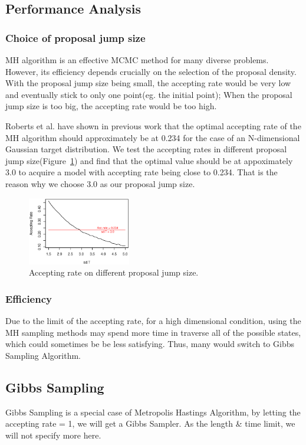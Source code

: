 \subsection{Performance Analysis}

\subsubsection{Choice of proposal jump size}
MH algorithm is an effective MCMC method for many diverse problems. However, its efficiency depends crucially on the selection of the proposal density. With the proposal jump size being small, the accepting rate would be very low and eventually stick to only one point(eg. the initial point); When the proposal jump size is too big, the accepting rate would be too high. 

Roberts et al. have shown in previous work\cite{roberts1997weak} that the optimal accepting rate of the MH algorithm should approximately be at 0.234 for the case of an N-dimensional Gaussian target distribution. We test the accepting rates in different proposal jump size(Figure~\ref{fig:acc_sdt}) and find that the optimal value should be at appoximately 3.0 to acquire a model with accepting rate being close to 0.234. That is the reason why we choose 3.0 as our proposal jump size.

\begin{figure}[tb]
  	\centering
  	\includegraphics[width=0.4\textwidth]{figure/acc_sdt.eps}
	\caption{Accepting rate on different proposal jump size.}
	\label{fig:acc_sdt}
\end{figure}

\subsubsection{Efficiency}
Due to the limit of the accepting rate, for a high dimensional condition, using the MH sampling methods may spend more time in traverse all of the possible states, which could sometimes be be less satisfying. Thus, many would switch to Gibbs Sampling Algorithm.




\subsection{Gibbs Sampling}
Gibbs Sampling is a special case of Metropolis Hastings Algorithm, by letting the accepting rate = 1, we will get a Gibbs Sampler. As the length \& time limit, we will not specify more here.






